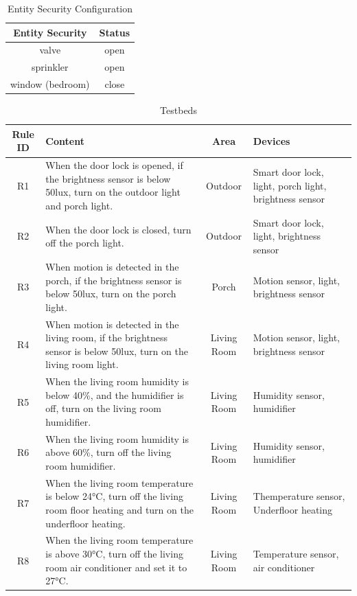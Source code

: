 \begin{table}[htbp]
	\caption{Entity Security Configuration}
	\label{entity_security_configuration}
	\centering
	\begin{tabular}{c|c}
		\hline
		\textbf{Entity Security} & \textbf{Status} \\
		\hline
		valve & open \\
		\hline
		sprinkler & open \\
		\hline
		window (bedroom) & close \\
		\hline
	\end{tabular}
\end{table}


\begin{table}[htbp]
	\caption{Testbeds}
	\label{Testbeds}
	\centering
	\begin{adjustbox}{width=\textwidth}
	\begin{tabular}{c|l|c|l}
		\hline
		\textbf{Rule ID} & \textbf{Content} & \textbf{Area} & \textbf{Devices} \\
		\hline
		R1 & When the door lock is opened, if the brightness sensor is below 50lux, turn on the outdoor light and porch light. & Outdoor & Smart door lock, light, porch light, brightness sensor \\
		\hline
		R2 & When the door lock is closed, turn off the porch light. & Outdoor & Smart door lock, light, brightness sensor \\
		\hline
		R3 & When motion is detected in the porch, if the brightness sensor is below 50lux, turn on the porch light. & Porch & Motion sensor, light, brightness sensor \\
		\hline
		R4 & When motion is detected in the living room, if the brightness sensor is below 50lux, turn on the living room light. & Living Room & Motion sensor, light, brightness sensor\\
		\hline
		R5 & When the living room humidity is below 40\%, and the humidifier is off, turn on the living room humidifier. & Living Room & Humidity sensor, humidifier \\
		\hline
		R6 & When the living room humidity is above 60\%, turn off the living room humidifier. & Living Room & Humidity sensor, humidifier \\
		\hline
		R7 & When the living room temperature is below 24°C, turn off the living room floor heating and turn on the underfloor heating. & Living Room & Themperature sensor, Underfloor heating\\
		\hline
		R8 & When the living room temperature is above 30°C, turn off the living room air conditioner and set it to 27°C. & Living Room & Temperature sensor, air conditioner \\

\end{tabular}
\end{adjustbox}
\end{table}
